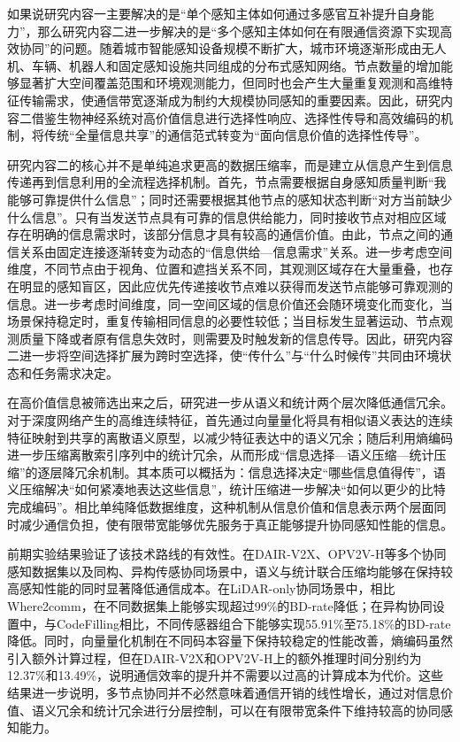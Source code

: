如果说研究内容一主要解决的是“单个感知主体如何通过多感官互补提升自身能力”，那么研究内容二进一步解决的是“多个感知主体如何在有限通信资源下实现高效协同”的问题。随着城市智能感知设备规模不断扩大，城市环境逐渐形成由无人机、车辆、机器人和固定感知设施共同组成的分布式感知网络。节点数量的增加能够显著扩大空间覆盖范围和环境观测能力，但同时也会产生大量重复观测和高维特征传输需求，使通信带宽逐渐成为制约大规模协同感知的重要因素。因此，研究内容二借鉴生物神经系统对高价值信息进行选择性响应、选择性传导和高效编码的机制，将传统“全量信息共享”的通信范式转变为“面向信息价值的选择性传导”。

研究内容二的核心并不是单纯追求更高的数据压缩率，而是建立从信息产生到信息传递再到信息利用的全流程选择机制。首先，节点需要根据自身感知质量判断“我能够可靠提供什么信息”；同时还需要根据其他节点的感知状态判断“对方当前缺少什么信息”。只有当发送节点具有可靠的信息供给能力，同时接收节点对相应区域存在明确的信息需求时，该部分信息才具有较高的通信价值。由此，节点之间的通信关系由固定连接逐渐转变为动态的“信息供给—信息需求”关系。进一步考虑空间维度，不同节点由于视角、位置和遮挡关系不同，其观测区域存在大量重叠，也存在明显的感知盲区，因此应优先传递接收节点难以获得而发送节点能够可靠观测的信息。进一步考虑时间维度，同一空间区域的信息价值还会随环境变化而变化，当场景保持稳定时，重复传输相同信息的必要性较低；当目标发生显著运动、节点观测质量下降或者原有信息失效时，则需要及时触发新的信息传导。因此，研究内容二进一步将空间选择扩展为跨时空选择，使“传什么”与“什么时候传”共同由环境状态和任务需求决定。

在高价值信息被筛选出来之后，研究进一步从语义和统计两个层次降低通信冗余。对于深度网络产生的高维连续特征，首先通过向量量化将具有相似语义表达的连续特征映射到共享的离散语义原型，以减少特征表达中的语义冗余；随后利用熵编码进一步压缩离散索引序列中的统计冗余，从而形成“信息选择—语义压缩—统计压缩”的逐层降冗余机制。其本质可以概括为：信息选择决定“哪些信息值得传”，语义压缩解决“如何紧凑地表达这些信息”，统计压缩进一步解决“如何以更少的比特完成编码”。相比单纯降低数据维度，这种机制从信息价值和信息表示两个层面同时减少通信负担，使有限带宽能够优先服务于真正能够提升协同感知性能的信息。

前期实验结果验证了该技术路线的有效性。在DAIR-V2X、OPV2V-H等多个协同感知数据集以及同构、异构传感协同场景中，语义与统计联合压缩均能够在保持较高感知性能的同时显著降低通信成本。在LiDAR-only协同场景中，相比Where2comm，在不同数据集上能够实现超过99\%的BD-rate降低；在异构协同设置中，与CodeFilling相比，不同传感器组合下能够实现55.91\%至75.18\%的BD-rate降低。同时，向量量化机制在不同码本容量下保持较稳定的性能改善，熵编码虽然引入额外计算过程，但在DAIR-V2X和OPV2V-H上的额外推理时间分别约为12.37\%和13.49\%，说明通信效率的提升并不需要以过高的计算成本为代价。这些结果进一步说明，多节点协同并不必然意味着通信开销的线性增长，通过对信息价值、语义冗余和统计冗余进行分层控制，可以在有限带宽条件下维持较高的协同感知能力。

